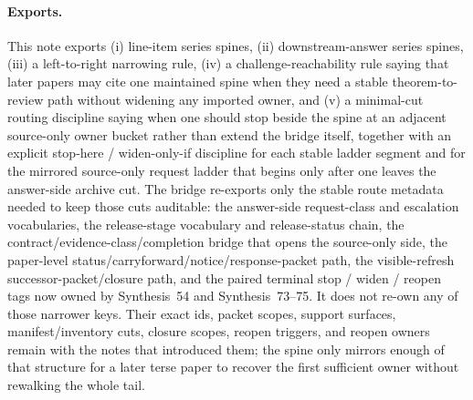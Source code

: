 \documentclass[11pt]{article}
\begin{document}
\paragraph{Exports.}
This note exports (i) line-item series spines, (ii) downstream-answer series spines, (iii) a left-to-right narrowing rule, (iv) a challenge-reachability rule saying that later papers may cite one maintained spine when they need a stable theorem-to-review path without widening any imported owner, and (v) a minimal-cut routing discipline saying when one should stop beside the spine at an adjacent source-only owner bucket rather than extend the bridge itself, together with an explicit stop-here / widen-only-if discipline for each stable ladder segment and for the mirrored source-only request ladder that begins only after one leaves the answer-side archive cut.
The bridge re-exports only the stable route metadata needed to keep those cuts auditable: the answer-side request-class and escalation vocabularies, the release-stage vocabulary and release-status chain, the contract/evidence-class/completion bridge that opens the source-only side, the paper-level status/carryforward/notice/response-packet path, the visible-refresh successor-packet/closure path, and the paired terminal stop / widen / reopen tags now owned by Synthesis~54 and Synthesis~73--75.
It does not re-own any of those narrower keys.
Their exact ids, packet scopes, support surfaces, manifest/inventory cuts, closure scopes, reopen triggers, and reopen owners remain with the notes that introduced them; the spine only mirrors enough of that structure for a later terse paper to recover the first sufficient owner without rewalking the whole tail.\cite{series:challengeanswerreviewmenus,series:publicrequestcontracts,series:requestableevidenceclasses,series:requestfulfillmentcertificates,series:publicrequeststatusenvelopes,series:publicrequestcarryforward,series:publicrequestnotices,series:publicrequestnoticenormalforms,series:publicrequestnoticeselections,series:publicrequestresponsemenus,series:publicrequestresponsepackets,series:publicrequestresponsepacketcarryforward,series:publicrequestresponsepacketdeltas,series:publicrequestresponsepacketrefreshnotices,series:publicrequestresponsepacketrefreshnoticenormalforms,series:publicrequestresponsepacketrefreshnoticeselections,series:publicrequestresponsepacketrefreshresponsemenus,series:publicrequestresponsepacketrefreshresponsepackets,series:publicrequestresponsepacketrefreshresponsepacketclosureverdicts,series:pairedterminalcitationdiscipline,series:pairedterminalcutoverrules}
\end{document}
